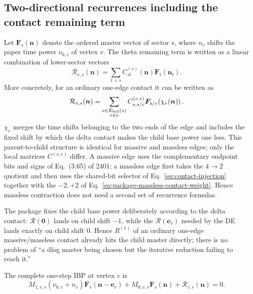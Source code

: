 \documentclass[11pt,a4paper]{article}
\newcommand{\cR}{\mathcal R}
\begin{document}
\subsection{Two-directional recurrences including the contact remaining term}

Let $\bm F_s(\bm n)$ denote the ordered master vector of sector $s$, where $n_v$ shifts the paper time power $\nu_{0,v}$ of vertex $v$. The theta remaining term is written as a linear combination of lower-sector vectors
\begin{equation}
 \cR_{v,s}(\bm n)
 =\sum_{t\prec s}C_{st}^{(v)}(\bm n)\bm F_t(\bm n_t).
 \label{eq:R-as-CF}
\end{equation}
More concretely, for an ordinary one-edge contact it can be written as
\begin{equation}
 \cR_{v,s}(\bm n)
 =\sum_{\substack{e\in E_{\rm full}(s)\\v\in e}}
 C_{s,s/e}^{(v,e)}
 \bm F_{s/e}\!\left(\chi_e(\bm n)\right).
 \label{eq:R-edge-sum}
\end{equation}
$\chi_e$ merges the time shifts belonging to the two ends of the edge and includes the fixed shift by which the delta contact makes the child base power one less. This parent-to-child structure is identical for massive and massless edges; only the local matrices $C^{(v,e)}$ differ. A massive edge uses the complementary endpoint bits and signs of Eq.~(3.65) of 2401; a massless edge first takes the $4\to2$ quotient and then uses the shared-bit selector of Eq.~\eqref{eq:contact-injection} together with the $-2,+2$ of Eq.~\eqref{eq:package-massless-contact-weight}. Hence massless contraction does not need a second set of recurrence formulas.

The package fixes the child base power deliberately according to the delta contact: $\cR(\bm0)$ lands on child shift $-1$, while the $\cR(\bm e_v)$ needed by the DE lands exactly on child shift $0$. Hence $R^{(1)}$ of an ordinary one-edge massive/massless contact already hits the child master directly; there is no problem of ``a dlog master being chosen but the iterative reduction failing to reach it.''

The complete one-step IBP at vertex $v$ is
\begin{equation}
 M_{1;v,s}(\nu_{0,v}+n_v)\bm F_s(\bm n-\bm e_v)
 +M_{0;v,s}\bm F_s(\bm n)
 +\cR_{v,s}(\bm n)=0.
 \label{eq:global-one-step-ibp}
\end{equation}
\end{document}
